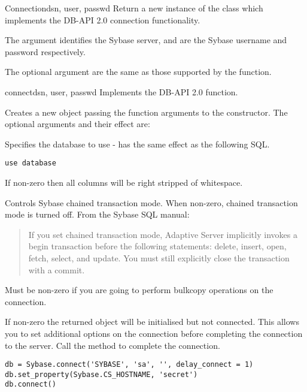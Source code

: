\begin{classdesc}{Connection}{dsn, user, passwd \optional{, \ldots}}
Return a new instance of the  class which implements
the DB-API 2.0 connection functionality.

The  argument identifies the Sybase server,  and
 are the Sybase username and password respectively.

The optional argument are the same as those supported by the
 function.
\end{classdesc}

\begin{funcdesc}{connect}{dsn, user, passwd \optional{, \ldots}}
Implements the DB-API 2.0  function.

Creates a new  object passing the function arguments
to the  constructor.  The
optional arguments and their effect are:

\begin{description}
\item{}

Specifies the database to use - has the same effect as the following
SQL.

\begin{verbatim}
use database
\end{verbatim}

\item{}

If non-zero then all  columns will be right stripped of
whitespace.

\item{}

Controls Sybase chained transaction mode.  When non-zero, chained
transaction mode is turned off.  From the Sybase SQL manual:

\begin{quote}
If you set chained transaction mode, Adaptive Server implicitly
invokes a begin transaction before the following statements: delete,
insert, open, fetch, select, and update. You must still explicitly
close the transaction with a commit.
\end{quote}

\item{}

Must be non-zero if you are going to perform bulkcopy operations on
the connection.

\item{}

If non-zero the returned  object will be initialised
but not connected.  This allows you to set additional options on the
connection before completing the connection to the server.  Call the
 method to complete the connection.

\begin{verbatim}
db = Sybase.connect('SYBASE', 'sa', '', delay_connect = 1)
db.set_property(Sybase.CS_HOSTNAME, 'secret')
db.connect()
\end{verbatim}
\end{description}
\end{funcdesc}

